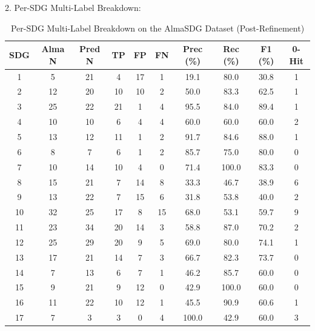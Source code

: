 2. Per-SDG Multi-Label Breakdown:
\begin{table}[!ht]
  \centering
  \caption{Per-SDG Multi-Label Breakdown on the AlmaSDG Dataset (Post-Refinement)}
  \label{tab:almasdg_per_sdg_PostRefinement}
  \begin{tabular}{
    S[table-format=2.0]
    S[table-format=2.0]
    S[table-format=2.0]
    S[table-format=2.0]
    S[table-format=2.0]
    S[table-format=2.0]
    S[table-format=3.1]
    S[table-format=3.1]
    S[table-format=3.1]
    S[table-format=1.0]
  }
    \toprule
    {\textbf{SDG}} & {\textbf{Alma N}} & {\textbf{Pred N}} & {\textbf{TP}} & {\textbf{FP}} & {\textbf{FN}} & {\textbf{Prec (\unit{\percent})}} & {\textbf{Rec (\unit{\percent})}} & {\textbf{F1 (\unit{\percent})}} & {\textbf{0-Hit}} \\
     &  5 & 21 &  4 & 17 &  1 &  19.1 &  80.0 & 30.8 & 1 \\
     2 & 12 & 20 & 10 & 10 &  2 &  50.0 &  83.3 & 62.5 & 1 \\
     3 & 25 & 22 & 21 &  1 &  4 &  95.5 &  84.0 & 89.4 & 1 \\
     4 & 10 & 10 &  6 &  4 &  4 &  60.0 &  60.0 & 60.0 & 2 \\
     5 & 13 & 12 & 11 &  1 &  2 &  91.7 &  84.6 & 88.0 & 1 \\
     6 &  8 &  7 &  6 &  1 &  2 &  85.7 &  75.0 & 80.0 & 0 \\
     7 & 10 & 14 & 10 &  4 &  0 &  71.4 & 100.0 & 83.3 & 0 \\
     8 & 15 & 21 &  7 & 14 &  8 &  33.3 &  46.7 & 38.9 & 6 \\
     9 & 13 & 22 &  7 & 15 &  6 &  31.8 &  53.8 & 40.0 & 2 \\
    10 & 32 & 25 & 17 &  8 & 15 &  68.0 &  53.1 & 59.7 & 9 \\
    11 & 23 & 34 & 20 & 14 &  3 &  58.8 &  87.0 & 70.2 & 2 \\
    12 & 25 & 29 & 20 &  9 &  5 &  69.0 &  80.0 & 74.1 & 1 \\
    13 & 17 & 21 & 14 &  7 &  3 &  66.7 &  82.3 & 73.7 & 0 \\
    14 &  7 & 13 &  6 &  7 &  1 &  46.2 &  85.7 & 60.0 & 0 \\
    15 &  9 & 21 &  9 & 12 &  0 &  42.9 & 100.0 & 60.0 & 0 \\
    16 & 11 & 22 & 10 & 12 &  1 &  45.5 &  90.9 & 60.6 & 1 \\
    17 &  7 &  3 &  3 &  0 &  4 & 100.0 &  42.9 & 60.0 & 3 \\
    \bottomrule
  \end{tabular}
\end{table}


